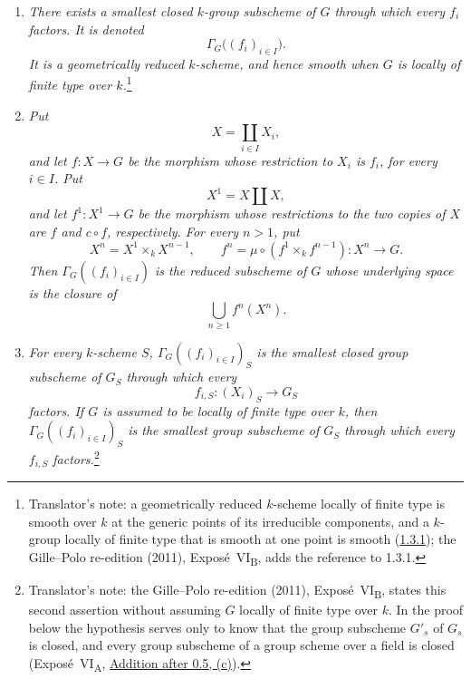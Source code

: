 \begin{enumerate}
\item[\textup{\SGAInlineRefTarget{prop:sga3-VIB-7.1:item:i}(i)}]\label{concl:sga3-VIB-7.1-i}
  \emph{There exists a smallest closed \(k\)-group subscheme of
  \(G\) through which every \(f_i\) factors. It is denoted
  \[
    \Gamma_G\bigl((f_i)_{i\in I}\bigr).
  \]
  It is a geometrically reduced \(k\)-scheme, and hence smooth
  when \(G\) is locally of finite type over \(k\).}\footnote{Translator's note: a geometrically reduced \(k\)-scheme
  locally of finite type is smooth over \(k\) at the generic points of its irreducible components, and a
  \(k\)-group locally of finite type that is smooth at one point is smooth
  (\hyperref[cor:sga3-VIB-1.3.1]{1.3.1}); the Gille--Polo re-edition (2011), Exposé~VI\textsubscript{B}, adds
  the reference to 1.3.1.}
\item[\textup{\SGAInlineRefTarget{prop:sga3-VIB-7.1:item:ii}(ii)}]\label{concl:sga3-VIB-7.1-ii}
  \emph{Put
  \[
    X=\coprod_{i\in I}X_i,
  \]
  and let \(f:X\to G\) be the morphism whose restriction to
  \(X_i\) is \(f_i\), for every \(i\in I\). Put
  \[
    X^1=X\amalg X,
  \]
  and let \(f^1:X^1\to G\) be the morphism whose restrictions to
  the two copies of \(X\) are \(f\) and \(c\circ f\),
  respectively. For every \(n>1\), put
  \[
    X^n=X^1\times_kX^{n-1},
    \qquad
    f^n=\mu\circ(f^1\times_k f^{n-1}):X^n\longrightarrow G.
  \]
  Then \(\Gamma_G((f_i)_{i\in I})\) is the reduced subscheme of
  \(G\) whose underlying space is the closure of
  \[
    \bigcup_{n\geq1}f^n(X^n).
  \]}
\item[\textup{\SGAInlineRefTarget{prop:sga3-VIB-7.1:item:iii}(iii)}]\label{concl:sga3-VIB-7.1-iii}
  \emph{For every \(k\)-scheme \(S\),
  \(\Gamma_G((f_i)_{i\in I})_S\) is the smallest closed group
  subscheme of \(G_S\) through which every
  \[
    f_{i,S}:(X_i)_S\longrightarrow G_S
  \]
  factors. If \(G\) is assumed to be locally of finite type
  over \(k\), then \(\Gamma_G((f_i)_{i\in I})_S\) is the smallest
  group subscheme of \(G_S\) through which every \(f_{i,S}\)
  factors.}\footnote{Translator's note: the Gille--Polo re-edition (2011), Exposé~VI\textsubscript{B}, states this
  second assertion without assuming \(G\) locally of finite type over \(k\). In the proof below the hypothesis
  serves only to know that the group subscheme \(G'_s\) of \(G_s\) is closed, and every group subscheme of a
  group scheme over a field is closed (Exposé~VI\textsubscript{A},
  \hyperref[sga3:VIA:0.5.2]{Addition after 0.5, (c)}).}
\end{enumerate}

